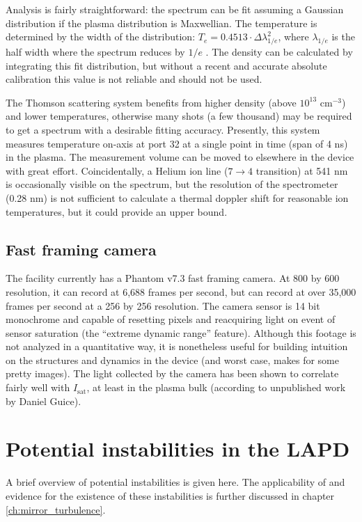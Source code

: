 Analysis is fairly straightforward: the spectrum can be fit assuming a Gaussian distribution if the plasma distribution is Maxwellian. The temperature is determined by the width of the distribution: $T_e = 0.4513 \cdot \Delta \lambda_{1/e}^2$, where $\lambda_{1/e}$ is the half width where the spectrum reduces by $1/e$ \cite{ghazaryan_thomson_2022}. The density can be calculated by integrating this fit distribution, but without a recent and accurate absolute calibration this value is not reliable and should not be used.

The Thomson scattering system benefits from higher density (above $10^{13}$ cm$^{-3}$) and lower temperatures, otherwise many shots (a few thousand) may be required to get a spectrum with a desirable fitting accuracy. Presently, this system measures temperature on-axis at port 32 at a single point in time (span of 4 ns) in the plasma. The measurement volume can be moved to elsewhere in the device with great effort. Coincidentally, a Helium ion line ($7 \rightarrow 4$ transition) at 541 nm is occasionally visible on the spectrum, but the resolution of the spectrometer (0.28 nm) is not sufficient to calculate a thermal doppler shift for reasonable ion temperatures, but it could provide an upper bound.

\subsection{Fast framing camera}

The facility currently has a Phantom v7.3 fast framing camera. At 800 by 600 resolution, it can record at 6,688 frames per second, but can record at over 35,000 frames per second at a 256 by 256 resolution. The camera sensor is 14 bit monochrome and capable of resetting pixels and reacquiring light on event of sensor saturation (the ``extreme dynamic range'' feature). Although this footage is not analyzed in a quantitative way, it is nonetheless useful for building intuition on the structures and dynamics in the device (and worst case, makes for some pretty images). The light collected by the camera has been shown to correlate fairly well with $I_\text{sat}$, at least in the plasma bulk (according to unpublished work by Daniel Guice). 

\section{Potential instabilities in the LAPD}

A brief overview of potential instabilities is given here. The applicability of and evidence for the existence of these instabilities is further discussed in chapter \ref{ch:mirror_turbulence}.

